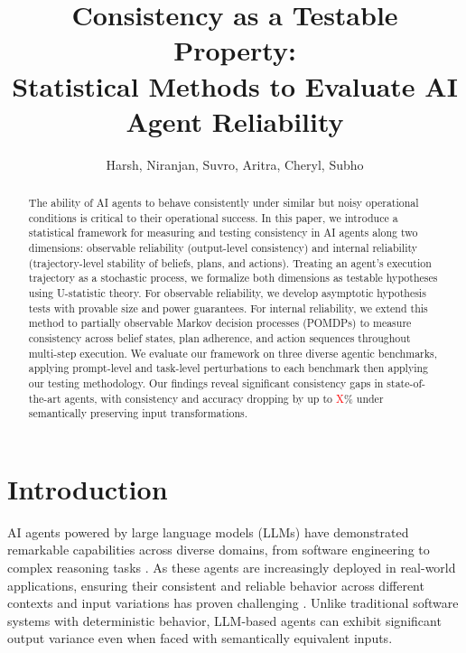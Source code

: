 \documentclass{article}
\title{Consistency as a Testable Property:\\
Statistical Methods to Evaluate AI Agent Reliability}
\author{Harsh, Niranjan, Suvro, Aritra, Cheryl, Subho}
\newcommand{\red}[1]{\textcolor{red}}
\theoremstyle{plain}
\theoremstyle{definition}
\theoremstyle{remark}
\begin{document}
\maketitle

\begin{abstract}
The ability of AI agents to behave consistently under similar but noisy operational conditions is critical to their operational success. In this paper, we introduce a statistical framework for measuring and testing consistency in AI agents along two dimensions: observable reliability (output-level consistency) and internal reliability (trajectory-level stability of beliefs, plans, and actions). Treating an agent's execution trajectory as a stochastic process, we formalize both dimensions as testable hypotheses using U-statistic theory. For observable reliability, we %
develop asymptotic hypothesis tests with provable size and power guarantees. For internal reliability, we extend this method to partially observable Markov decision processes (POMDPs) to measure consistency across belief states, plan adherence, and action sequences throughout multi-step execution. We evaluate our framework on three diverse agentic benchmarks, applying prompt-level and task-level perturbations to each benchmark then applying our testing methodology. Our findings reveal significant consistency gaps in state-of-the-art agents, with consistency and accuracy dropping by up to {\red XX}\% under semantically preserving input transformations. %
\end{abstract}

\section{Introduction}

AI agents powered by large language models (LLMs) have demonstrated remarkable capabilities across diverse domains, from software engineering \cite{jimenez2024swebench} to complex reasoning tasks \cite{yao2023react}. As these agents are increasingly deployed in real-world applications, ensuring their consistent and reliable behavior across different contexts and input variations has proven challenging \cite{rabanser2026scienceaiagentreliability}. Unlike traditional software systems with deterministic behavior, LLM-based agents can exhibit significant output variance even when faced with semantically equivalent inputs.
\end{document}
